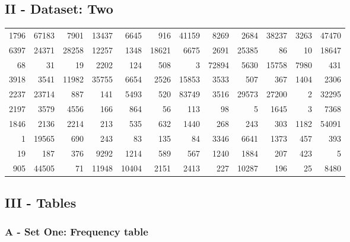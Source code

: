 \documentclass[10pt]{report}
\begin{document}

\subsection*{II - Dataset: Two}

\begin{tabular}{rrrrrrrrrrrr}
    \hline
    1796 & 67183 &  7901 & 13437 &  6645 &   916 & 41159 &  8269 &  2684 & 38237 & 3263 & 47470 \\
    6397 & 24371 & 28258 & 12257 &  1348 & 18621 &  6675 &  2691 & 25385 &    86 &   10 & 18647 \\
    68 &    31 &    19 &  2202 &   124 &   508 &     3 & 72894 &  5630 & 15758 & 7980 &   431 \\
    3918 &  3541 & 11982 & 35755 &  6654 &  2526 & 15853 &  3533 &   507 &   367 & 1404 &  2306 \\
    2237 & 23714 &   887 &   141 &  5493 &   520 & 83749 &  3516 & 29573 & 27200 &    2 & 32295 \\
    2197 &  3579 &  4556 &   166 &   864 &    56 &   113 &    98 &     5 &  1645 &    3 &  7368 \\
    1846 &  2136 &  2214 &   213 &   535 &   632 &  1440 &   268 &   243 &   303 & 1182 & 54091 \\
    1 & 19565 &   690 &   243 &    83 &   135 &    84 &  3346 &  6641 &  1373 &  457 &   393 \\
    19 &   187 &   376 &  9292 &  1214 &   589 &   567 &  1240 &  1884 &   207 &  423 &     5 \\
    905 & 44505 &    71 & 11948 & 10404 &  2151 &  2413 &   227 & 10287 &   196 &   25 &  8480 \\
    \hline
\end{tabular}


\subsection*{III - Tables}

\subsubsection*{A - Set One: Frequency table}
\end{document}
